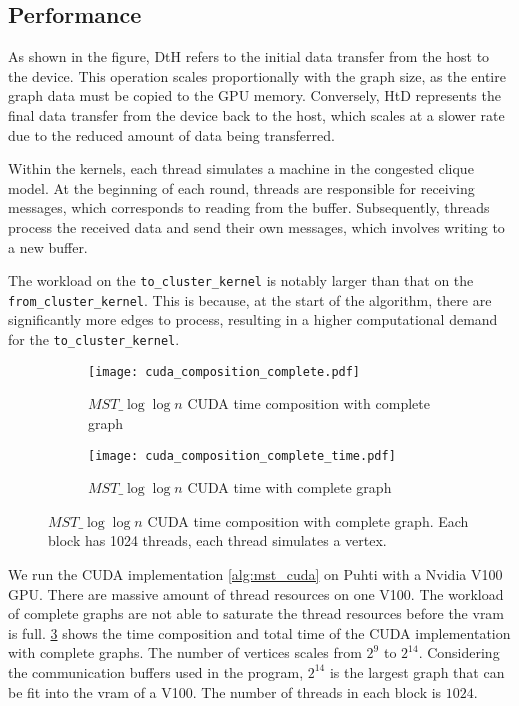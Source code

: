 \documentclass[english, 12pt, a4paper, elec, utf8, a-2b, online]{aaltothesis}
\newcommand{\mstalgo}{$MST\_\log\log{n}$}
\begin{document}
\subsection{Performance}
\begin{tcolorbox}[colback=white,colframe=black,boxrule=1pt,arc=0pt]
As shown in the figure, DtH refers to the initial data transfer from the host to the device. This operation scales proportionally with the graph size, as the entire graph data must be copied to the GPU memory. Conversely, HtD represents the final data transfer from the device back to the host, which scales at a slower rate due to the reduced amount of data being transferred.

Within the kernels, each thread simulates a machine in the congested clique model. At the beginning of each round, threads are responsible for receiving messages, which corresponds to reading from the buffer. Subsequently, threads process the received data and send their own messages, which involves writing to a new buffer.

The workload on the \texttt{to\_cluster\_kernel} is notably larger than that on the \texttt{from\_cluster\_kernel}. This is because, at the start of the algorithm, there are significantly more edges to process, resulting in a higher computational demand for the \texttt{to\_cluster\_kernel}.
\end{tcolorbox}

\begin{figure}[h]
	\begin{subfigure}[b]{0.45\textwidth}
		\centering
		\texttt{[image: cuda\_composition\_complete.pdf]}
		\caption{\mstalgo{} CUDA time composition with complete graph}
		\label{fig:cuda_composition_complete.pdf}
	\end{subfigure}
	\begin{subfigure}[b]{0.45\textwidth}
		\centering
		\texttt{[image: cuda\_composition\_complete\_time.pdf]}
		\caption{\mstalgo{} CUDA time with complete graph}
		\label{fig:cuda_composition_complete_time.pdf}
	\end{subfigure}
	\caption{\mstalgo{} CUDA time composition with complete graph. Each block has 1024 threads, each thread simulates a vertex.}
	\label{fig:cuda_composition_complete}
\end{figure}

We run the CUDA implementation \cref{alg:mst_cuda} on Puhti with a Nvidia V100 GPU. There are massive amount of thread resources on one V100. The workload of complete graphs are not able to saturate the thread resources before the vram is full. \cref{fig:cuda_composition_complete} shows the time composition and total time of the CUDA implementation with complete graphs. The number of vertices scales from $2^{9}$ to $2^{14}$. Considering the communication buffers used in the program, $2^{14}$ is the largest graph that can be fit into the vram of a V100. The number of threads in each block is $1024$.
\end{document}
